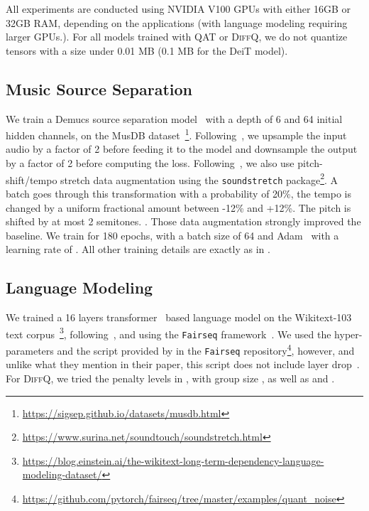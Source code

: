 \documentclass{article}
\newcommand{\diffq}{\textsc{DiffQ}\xspace}
\begin{document}
All experiments are conducted using NVIDIA V100 GPUs with either 16GB or 32GB RAM, depending on the applications
(with language modeling requiring larger GPUs.).
For all models trained with QAT or \diffq, we do not quantize tensors with a size under 0.01 MB (0.1 MB for the DeiT model).

\vspace{-0.2cm}
\subsection{Music Source Separation}
\vspace{-0.1cm}
We train a Demucs source separation model~\citep{defossez2019music} with a depth of 6 and 64 initial hidden channels, on the MusDB dataset~\citep{musdb}\footnote{\url{https://sigsep.github.io/datasets/musdb.html}}. Following~\citet{defossez2020real}, we upsample the input audio by a factor of 2 before feeding it to the model and downsample the output by a factor of 2 before computing the loss. Following~\citet{cohen2019improving}, we also use pitch-shift/tempo stretch data augmentation using the 
\texttt{soundstretch} package\footnote{\url{https://www.surina.net/soundtouch/soundstretch.html}}. A batch goes through
this transformation with a probability of 20\%, the tempo is changed by a uniform fractional amount between -12\% and +12\%.
The pitch is shifted by at most 2 semitones. . Those data augmentation strongly
improved the baseline. We train for 180 epochs, with a batch size of 64 and Adam~\citep{adam} with a learning rate of . All other training details are exactly as in \citep{defossez2019music}.

\vspace{-0.2cm}
\subsection{Language Modeling}
\vspace{-0.1cm}
We trained a 16 layers transformer~\citep{vaswani2017attention} based language model on the Wikitext-103 text corpus~\citep{merity2016pointer}\footnote{\url{https://blog.einstein.ai/the-wikitext-long-term-dependency-language-modeling-dataset/}},
following~\citet{baevski2018adaptive},
 and using the \texttt{Fairseq} framework~\citep{ott2019fairseq}. 
 We used the hyper-parameters and the script provided by \citep{fan2020training} in the \texttt{Fairseq} repository\footnote{\url{https://github.com/pytorch/fairseq/tree/master/examples/quant_noise}}, however, and unlike what they mention in their paper, this script does not include layer drop~\citep{fan2019reducing}.
 For \diffq, we tried the penalty levels  in , with group size , as well as  and .
\end{document}
